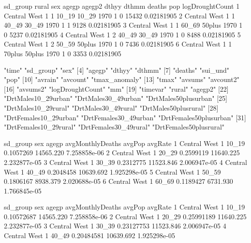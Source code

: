 \documentclass[a4paper]{article}                %
\begin{document}
\begin{Schunk}
\begin{Soutput}
      sd_group rural sex  agegp agegp2 dthyy dthmm deaths   pop logDroughtCount
1 Central West     1   1  10_19  10_29  1970     1      0 15432      0.02181905
2 Central West     1   1  40_49  30_49  1970     1      1  9128      0.02181905
3 Central West     1   1  60_69 50plus  1970     1      0  5237      0.02181905
4 Central West     1   2  40_49  30_49  1970     1      0  8488      0.02181905
5 Central West     1   2  50_59 50plus  1970     1      0  7436      0.02181905
6 Central West     1   1 70plus 50plus  1970     1      0  3353      0.02181905
\end{Soutput}
\begin{Soutput}
 [1] "time"                  "sd_group"              "sex"                  
 [4] "agegp"                 "dthyy"                 "dthmm"                
 [7] "deaths"                "sui_und"               "pop"                  
[10] "avrain"                "avcount"               "tmax_anomaly"         
[13] "tmax"                  "avsums"                "avcount2"             
[16] "avsums2"               "logDroughtCount"       "mm"                   
[19] "timevar"               "rural"                 "agegp2"               
[22] "DrtMales10_29urban"    "DrtMales30_49urban"    "DrtMales50plusurban"  
[25] "DrtMales10_29rural"    "DrtMales30_49rural"    "DrtMales50plusrural"  
[28] "DrtFemales10_29urban"  "DrtFemales30_49urban"  "DrtFemales50plusurban"
[31] "DrtFemales10_29rural"  "DrtFemales30_49rural"  "DrtFemales50plusrural"
\end{Soutput}
\begin{Soutput}
      sd_group sex agegp avgMonthlyDeaths    avgPop      avgRate
1 Central West   1 10_19        0.1057269 14565.220 7.258858e-06
2 Central West   1 20_29        0.2599119 11640.225 2.232877e-05
3 Central West   1 30_39        0.2312775 11523.846 2.006947e-05
4 Central West   1 40_49        0.2048458 10639.692 1.925298e-05
5 Central West   1 50_59        0.1806167  8938.379 2.020688e-05
6 Central West   1 60_69        0.1189427  6731.930 1.766845e-05
\end{Soutput}
\begin{Soutput}
       sd_group sex  agegp avgMonthlyDeaths    avgPop      avgRate
1  Central West   1  10_19       0.10572687 14565.220 7.258858e-06
2  Central West   1  20_29       0.25991189 11640.225 2.232877e-05
3  Central West   1  30_39       0.23127753 11523.846 2.006947e-05
4  Central West   1  40_49       0.20484581 10639.692 1.925298e-05

\end{Soutput}
\end{Schunk}
\end{document}
